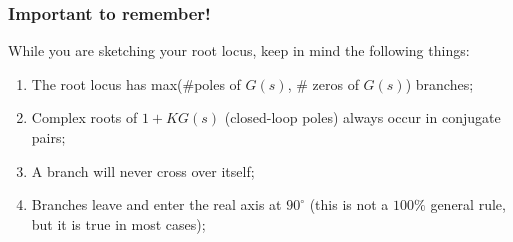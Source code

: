 \begin{frame}
\frametitle{Important to remember!}
	\begin{alertblock}{}
		While you are sketching your root locus, keep in mind the following things:
		\begin{enumerate}
			\item The root locus has max($\#$poles of $G(s)$, $\#$ zeros of $G(s)$) branches;
			\item Complex roots of $1 + KG(s)$ (closed-loop poles) always occur in conjugate pairs;
			\item A branch will never cross over itself;
			\item Branches leave and enter the real axis at $90^{\circ}$ (this is not a $100\%$ general rule, but it is true in most cases);
		\end{enumerate}
	\end{alertblock}
\end{frame}

